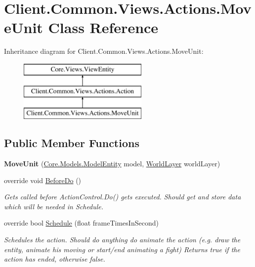 \hypertarget{classClient_1_1Common_1_1Views_1_1Actions_1_1MoveUnit}{\section{Client.\-Common.\-Views.\-Actions.\-Move\-Unit Class Reference}
\label{classClient_1_1Common_1_1Views_1_1Actions_1_1MoveUnit}
}
Inheritance diagram for Client.\-Common.\-Views.\-Actions.\-Move\-Unit\-:\begin{figure}[H]
\begin{center}
\leavevmode
\includegraphics[height=3.000000cm]{classClient_1_1Common_1_1Views_1_1Actions_1_1MoveUnit}
\end{center}
\end{figure}
\subsection*{Public Member Functions}
\begin{DoxyCompactItemize}
\item 
\hypertarget{classClient_1_1Common_1_1Views_1_1Actions_1_1MoveUnit_a319fe131766962c21c60417a582880bd}{{\bfseries Move\-Unit} (\hyperlink{classCore_1_1Models_1_1ModelEntity}{Core.\-Models.\-Model\-Entity} model, \hyperlink{classClient_1_1Common_1_1Views_1_1WorldLayer}{World\-Layer} world\-Layer)}\label{classClient_1_1Common_1_1Views_1_1Actions_1_1MoveUnit_a319fe131766962c21c60417a582880bd}

\item 
override void \hyperlink{classClient_1_1Common_1_1Views_1_1Actions_1_1MoveUnit_a781a55c5c7523ceeee2f64e275d35d09}{Before\-Do} ()
\begin{DoxyCompactList}\small\item\em Gets called before Action\-Control.\-Do() gets executed. Should get and store data which will be needed in Schedule. \end{DoxyCompactList}\item 
override bool \hyperlink{classClient_1_1Common_1_1Views_1_1Actions_1_1MoveUnit_a320dbf0d26ea3e24cfe87eedb61a2e22}{Schedule} (float frame\-Times\-In\-Second)
\begin{DoxyCompactList}\small\item\em Schedules the action. Should do anything do animate the action (e.\-g. draw the entity, animate his moving or start/end animating a fight) Returns true if the action has ended, otherwise false. \end{DoxyCompactList}\end{DoxyCompactItemize}
